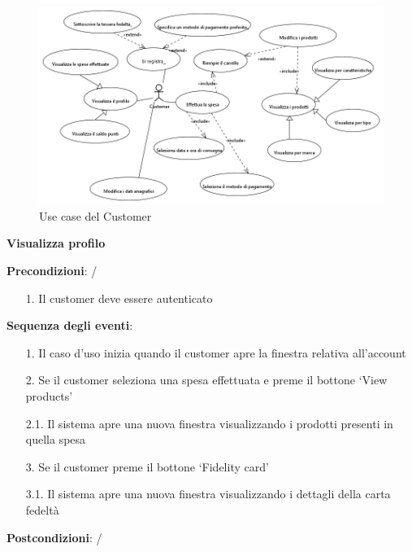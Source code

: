 \documentclass[12pt]{article}
\begin{document}
\begin{figure}[h!]
	\begin{center}
 	 	\includegraphics[width=\textwidth,height=\textheight,keepaspectratio]{media/diagrams/use_case/customer.png}
  	 	 \caption{Use case del Customer}
	\end{center}
\end{figure}

\textbf{Visualizza profilo}
\begin{tcolorbox}
\textbf{Precondizioni}: /
	\begin{enumerate}
	\item[1.]	Il customer deve essere autenticato
	\end{enumerate}
\textbf{Sequenza degli eventi}:
	\begin{enumerate}
	\item[1.]	Il caso d’uso inizia quando il customer apre la finestra relativa all’account
	\item[2.]	Se il customer seleziona una spesa effettuata e preme il bottone ‘View products’
 	\item[2.1.]  Il sistema apre una nuova finestra visualizzando i prodotti presenti in quella spesa
 	\item[3.]	Se il customer preme il bottone ‘Fidelity card’
 	\item[3.1.] Il sistema apre una nuova finestra visualizzando i dettagli della carta fedeltà
	\end{enumerate}
\textbf{Postcondizioni}: /
\end{tcolorbox}
\clearpage
\end{document}
